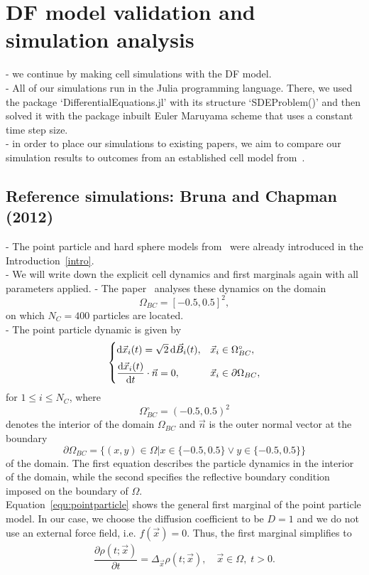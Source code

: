 \section{DF model validation and simulation analysis} \label{sanitycheck}
- we continue by making cell simulations with the DF model. \\
- All of our simulations run in the Julia programming language. 
There, we used the package `DifferentialEquations.jl' with its structure `SDEProblem()' and then solved it with the package inbuilt Euler Maruyama scheme that uses a constant time step size. \\
- in order to place our simulations to existing papers, we aim to compare our simulation results to outcomes from an established cell model from~\cite{Bruna2012}. \\

\subsection{Reference simulations: Bruna and Chapman (2012)}
- The point particle and hard sphere models from~\cite{Bruna2012} were already introduced in the Introduction~\ref{intro}. \\
- We will write down the explicit cell dynamics and first marginals again with all parameters applied.
- The paper~\cite{Bruna2012} analyses these dynamics on the domain 
\[\Omega_{BC} = [-0.5, 0.5]^2,\]
on which $N_{C} = 400$ particles are located. \\

- The point particle dynamic is given by
\begin{equation*}
    \begin{cases}
        \mathrm{d} \vec{x}_i(t) = \sqrt{2} \, \mathrm{d} \vec{B}_i(t), & \vec{x}_i \in \Omega_{BC}^{\circ}, \\[0.5em]
        \dfrac{\mathrm{d} \vec{x}_i(t)}{\mathrm{d} t} \cdot \vec{n} = 0, & \vec{x}_i \in \partial \Omega_{BC},
    \end{cases}
\end{equation*}
for $1 \leq i \leq N_C$, where 
\[
    \Omega_{BC}^{\circ} = (-0.5, 0.5)^2
\]
denotes the interior of the domain $\Omega_{BC}$ and $\vec{n}$ is the outer normal vector at the boundary 
\[
    \partial \Omega_{BC} = \{(x,y) \in \Omega | x \in \{-0.5, 0.5\} \lor y \in \{-0.5, 0.5\} \}
\]
of the domain. 
The first equation describes the particle dynamics in the interior of the domain, while the second specifies the reflective boundary condition imposed on the boundary of $\Omega$. \\ 
Equation~\eqref{equ:pointparticle} shows the general first marginal of the point particle model.
In our case, we choose the diffusion coefficient to be $D = 1$ and we do not use an external force field, i.e. $f(\vec{x}) = 0$.
Thus, the first marginal simplifies to
\begin{align}
	\dfrac{\partial \rho (t; \vec{x})}{\partial t} = \Delta_{\vec{x}} \rho(t; \vec{x}) , \quad \vec{x} \in \Omega, \; t>0.
    \label{equ:marginalPP}
\end{align}




